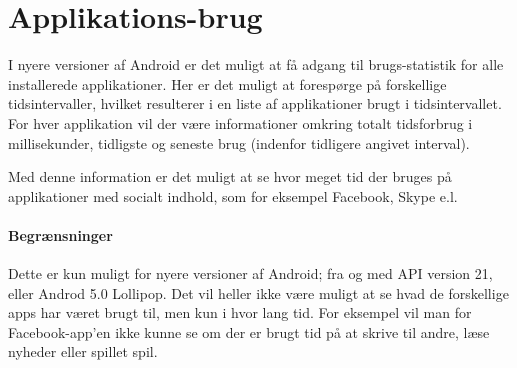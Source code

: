 \section{Applikations-brug}
I nyere versioner af Android er det muligt at få adgang til brugs-statistik for alle installerede applikationer.
Her er det muligt at forespørge på forskellige tidsintervaller, hvilket resulterer i en liste af applikationer brugt i tidsintervallet.
For hver applikation vil der være informationer omkring totalt tidsforbrug i millisekunder, tidligste og seneste brug (indenfor tidligere angivet interval).

Med denne information er det muligt at se hvor meget tid der bruges på applikationer med socialt indhold, som for eksempel Facebook, Skype e.l.

\paragraph{Begrænsninger}
Dette er kun muligt for nyere versioner af Android; fra og med API version 21, eller Androd 5.0 Lollipop.
Det vil heller ikke være muligt at se hvad de forskellige apps har været brugt til, men kun i hvor lang tid.
For eksempel vil man for Facebook-app'en ikke kunne se om der er brugt tid på at skrive til andre, læse nyheder eller spillet spil.
